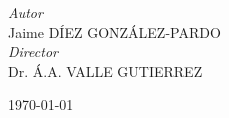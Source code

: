 \documentclass[a4paper, 11pt, oneside]{book}
\renewcommand{\abstracttextfont}{\normalfont\small\itshape} %
\begin{document}
\begin{titlepage}
			
				\begin{flushright}
					\large
					\textit{Autor}\\
					Jaime \textsc{DÍEZ GONZÁLEZ-PARDO} \\ %
					\large
					\textit{Director}\\
					Dr. Á.A. \textsc{VALLE GUTIERREZ} %
				\end{flushright}
			
			
				\vfill\vfill\vfill %
				
				{\large\today} %
				
			
				\vfill %
		
		\end{titlepage}


		\renewcommand{\abstractname}{Abstract}
		\renewcommand{\abstracttextfont}{\normalfont\small\itshape}



		\tableofcontents

		\listoffigures


\end{document}
